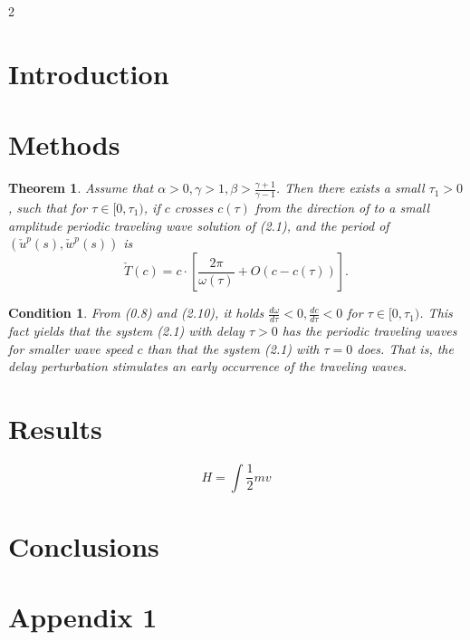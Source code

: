 \documentclass[openacc]{rsproca_new}%
\newtheorem{theorem}{\bf Theorem}[section]
\newtheorem{condition}{\bf Condition}[section]
\begin{document}
\begin{multicols}{2}

\section{Introduction}

    \lipsum[1]
    
    \lipsum[1]\cite{McKendrick}
    
    \lipsum[1]\cite{Filipe2003, Brauer2008, Cross2005}
    
\section{Methods}

    \begin{theorem}\label{T0.1}
        Assume that $\alpha>0, \gamma>1, \beta>\frac{\gamma+1}{\gamma-1}$.
        Then there exists a small $\tau_1>0$, such that for $\tau\in
        [0,\tau_1)$, if $c$ crosses $c(\tau)$ from the direction of
        to  a small amplitude periodic traveling wave solution of
        (2.1), and the period of $(\check{u}^p(s),\check{w}^p(s))$ is
        \[
        \check{T}(c)=c\cdot \left[\frac{2\pi}{\omega(\tau)}+O(c-c(\tau))\right].
        \]
    \end{theorem}
    
    
    \begin{condition}\label{C2.2}
        From (0.8) and (2.10), it holds
        $\frac{d\omega}{d\tau}<0,\frac{dc}{d\tau}<0$ for $\tau\in
        [0,\tau_1)$. This fact yields that the system (2.1) with delay
        $\tau>0$ has the periodic traveling waves for smaller wave speed $c$
        than that the system (2.1) with $\tau=0$ does. That is, the
        delay perturbation stimulates an early occurrence of the traveling waves.
    \end{condition}

\section{Results}

    \lipsum[1]

    \begin{equation}
        H=\int\frac{1}{2}mv
    \end{equation}
    
    \lipsum[1]

\section{Conclusions}

    \lipsum[1]

\appendix

\section{Appendix 1}

    \lipsum[1-3]

\end{multicols}
\end{document}
